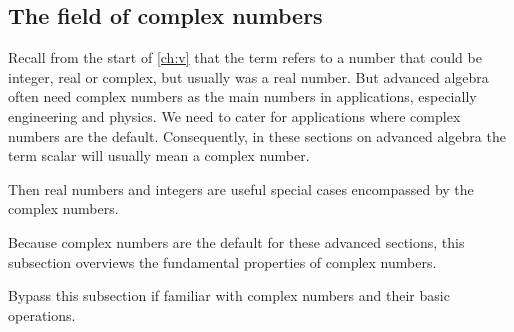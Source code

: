 \begin{draft}
%
%
%
%
%
%
%
%

\subsection{The field of complex numbers}
\label{sec:fcn}

Recall from the start of \cref{ch:v} that the term  refers to a number that could be integer, real or complex, but usually was a real number.
But advanced algebra often need complex numbers as the main numbers in applications, especially engineering and physics. 
We need to cater for applications where complex numbers are the default.
Consequently, in these sections on advanced algebra the term scalar will usually mean a complex number.

Then real numbers and integers are useful special cases encompassed by the complex numbers.

Because complex numbers are the default for these advanced sections, this subsection overviews the fundamental properties of complex numbers.
\begin{aside}
Bypass this subsection if familiar with complex numbers and their basic operations.
\end{aside}


\end{draft}
